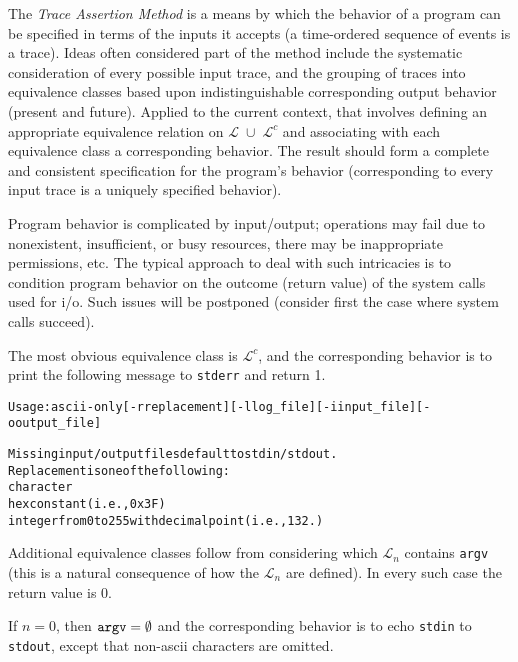 \documentclass[12pt]{article}
\begin{document}
\bigskip

The \emph{Trace Assertion Method} is a means by which the behavior of a program can be specified
in terms of the inputs it accepts (a time-ordered sequence of events is a trace). Ideas
often considered part of the method include the systematic consideration of every possible
input trace, and the grouping of traces into equivalence classes based upon indistinguishable
corresponding output behavior (present and future). Applied to the current context, that
involves defining an appropriate equivalence relation on $ \mathcal{L} \;\cup\; \mathcal{L}^c $ 
and associating with each equivalence class a corresponding behavior. The result should form a 
complete and consistent specification for the program’s behavior (corresponding to every input 
trace is a uniquely specified behavior).

\bigskip

Program behavior is complicated by input/output; operations may fail due to nonexistent,
insufficient, or busy resources, there may be inappropriate permissions, etc. The typical
approach to deal with such intricacies is to condition program behavior on the outcome
(return value) of the system calls used for i/o. Such issues will be postponed (consider first
the case where system calls succeed).

\bigskip

The most obvious equivalence class is $ \mathcal{L}^c $, and the corresponding behavior is to print the
following message to \texttt{stderr} and return 1.

\bigskip

\begin{alltt}
Usage: ascii-only [-r replacement] [-l log\_file ] [-i input\_file] [-o output\_file]

  Missing input/output files default to stdin/stdout.
    Replacement is one of the following:
    character
    hex constant ( i.e., 0x3F )
    integer from 0 to 255 with decimal point ( i.e., 132. )

\end{alltt}


Additional equivalence classes follow from considering which $ \mathcal{L}_n $ contains \texttt{argv} 
(this is a natural consequence of how the $ \mathcal{L}_n $ are defined). 
In every such case the return value is 0.


\newpage

If $n = 0$, then $\tt{argv} = \emptyset$ and the corresponding behavior is to echo \texttt{stdin} 
to \texttt{stdout}, except that non-ascii characters are omitted. \\
\end{document}
